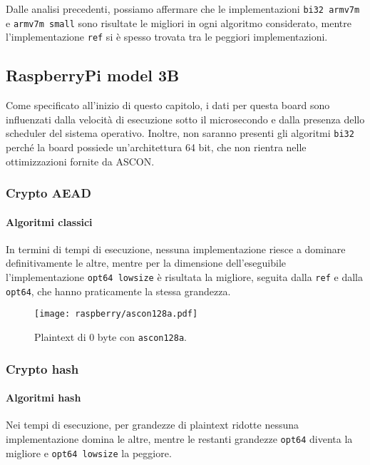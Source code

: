 Dalle analisi precedenti, possiamo affermare che le implementazioni \texttt{bi32 armv7m} e \texttt{armv7m small} sono risultate le migliori in ogni algoritmo considerato, mentre l'implementazione \texttt{ref} si è spesso trovata tra le peggiori implementazioni.

\subsection{RaspberryPi model 3B}

Come specificato all'inizio di questo capitolo, i dati per questa board sono influenzati dalla velocità di esecuzione sotto il microsecondo e dalla presenza dello scheduler del sistema operativo. Inoltre, non saranno presenti gli algoritmi \texttt{bi32} perché la board possiede un'architettura 64 bit, che non rientra nelle ottimizzazioni fornite da ASCON.

\subsubsection{Crypto AEAD}

\paragraph{Algoritmi classici}

In termini di tempi di esecuzione, nessuna implementazione riesce a dominare definitivamente le altre, mentre per la dimensione dell'eseguibile l'implementazione \texttt{opt64 lowsize} è risultata la migliore, seguita dalla \texttt{ref} e dalla \texttt{opt64}, che hanno praticamente la stessa grandezza.

\begin{figure}[H]
    \centering
    \texttt{[image: raspberry/ascon128a.pdf]}
    \caption{Plaintext di 0 byte con \texttt{ascon128a}.}
\end{figure}

\subsubsection{Crypto hash}

\paragraph{Algoritmi hash}

Nei tempi di esecuzione, per grandezze di plaintext ridotte nessuna implementazione domina le altre, mentre le restanti grandezze \texttt{opt64} diventa la migliore e \texttt{opt64 lowsize} la peggiore. \\

